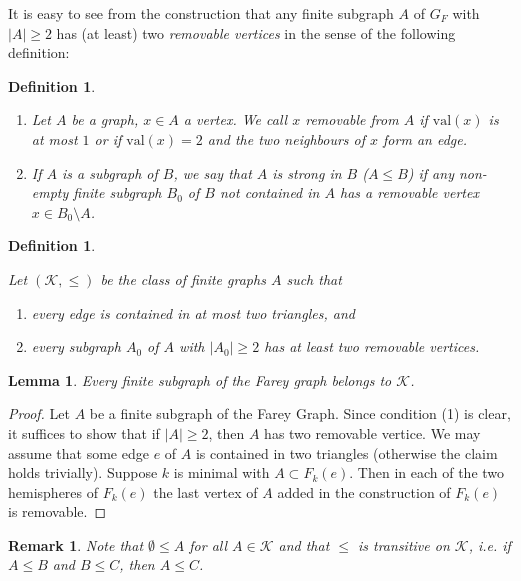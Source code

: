 \documentclass{amsart}
\newcommand{\K}{\mathcal{K}}
\newcommand{\val}{\mathrm{val}}
\newtheorem{definition}[defi]{Definition}
\newtheorem{lemma}[defi]{Lemma}
\newtheorem{remark}[defi]{Remark}
\begin{document}
  

It is easy to see from the construction that any finite subgraph $A$ of $G_F$ with $|A|\geq 2$ has (at least) two \emph{removable vertices}
in the sense of the following definition:

\begin{definition}\label{def:removable}
\begin{enumerate}
    \item 
    Let $A$ be a graph, $x\in A$ a vertex. We call $x$ removable from $A$ if $\val(x)$ is at most $1$ or if $\val(x)=2$ and the two neighbours of $x$ form an edge.

    \item If $A$ is a subgraph of $B$, we say that $A$ is strong in $B$ ($A\leq B$) if any non-empty finite subgraph $B_0$ of $B$ not contained in $A$ has a removable vertex $x\in B_0\setminus A$. 
    \end{enumerate}
\end{definition}



\begin{definition}\label{def:K}
    
Let $(\K,\leq)$ be the class of finite graphs $A$ such that
\begin{enumerate}
    \item every edge is contained in at most two triangles, and
    \item every subgraph $A_0$ of $A$ with $|A_0|\geq 2$ has at least two removable vertices.
\end{enumerate}
\end{definition}


\begin{lemma}\label{lem:FG in K}
Every finite subgraph of the Farey graph belongs to $\K$.
\end{lemma}
\begin{proof}
Let $A$ be a finite subgraph of the Farey Graph. Since  condition (1) is clear, it suffices to show that if $|A|\geq 2$, then $A$ has two removable vertice. We may assume that some edge $e$ of $A$ is contained in two triangles (otherwise the claim holds trivially). Suppose $k$ is minimal with $A\subset F_k(e)$. Then in each of the two hemispheres of $F_k(e)$ the last vertex of $A$ added in the construction of $F_k(e)$ is removable.
\end{proof}

\begin{remark} Note that $\emptyset\leq A$ for all $A\in \K$
and that $\leq$ is transitive on $\K$, i.e. if $A\leq B$ and $B\leq C$, then $A\leq C$.
\end{remark} 
\end{document}
